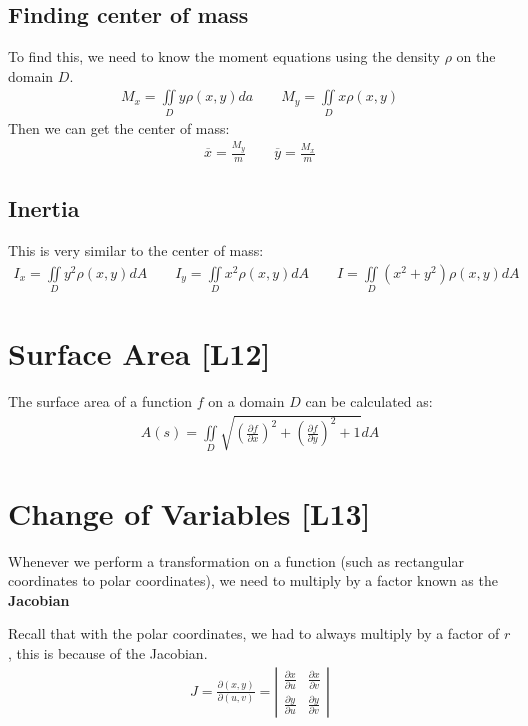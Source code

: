 \documentclass[12pt,letterpaper]{article} \usepackage{amsmath} \usepackage{graphicx} \usepackage[margin=1in]{geometry} \usepackage{longtable}  \usepackage{amssymb}
\begin{document}
	\subsection{Finding center of mass}
	To find this, we need to know the moment equations using the density $\rho$ on the domain $D$.
	\begin{align*}
		M_x = \iint\limits_D y\rho(x,y) da \qquad M_y = \iint\limits_D x\rho(x,y)
	\end{align*}
	Then we can get the center of mass:
	\begin{align*}
		\overline{x} = \frac{M_y}{m} \qquad \overline{y} = \frac{M_x}{m}
	\end{align*}
	
	\subsection{Inertia}
	This is very similar to the center of mass:
	\begin{align*}
		I_x = \iint\limits_D y^2 \rho(x,y) dA \qquad I_y = \iint\limits_D x^2 \rho(x,y)dA \qquad I = \iint\limits_D \left(x^2 + y^2 \right) \rho(x,y) dA
	\end{align*}
	
	
	\section{Surface Area [L12]}
	The surface area of a function $f$ on a domain $D$ 	can be calculated as:
	\begin{align*}
		A(s) =  \iint\limits_D \sqrt{\left(\frac{\partial f}{\partial x} \right)^2 + \left(\frac{\partial f}{\partial y}\right)^2 + 1} dA
	\end{align*}

	\section{Change of Variables [L13]}
	Whenever we perform a transformation on a function (such as rectangular coordinates to polar coordinates), we need to multiply by a factor known as the \textbf{Jacobian}
	
	Recall that with the polar coordinates, we had to always multiply by a factor of $r$, this is because of the Jacobian.
	\begin{align*}
		J = \frac{\partial (x,y) }{\partial (u,v)} = \left|\begin{array}{cc} \frac{\partial x}{\partial u} & \frac{\partial x}{\partial v} \\ \frac{\partial y}{\partial u} & \frac{\partial y}{\partial v} \end{array}\right|
	\end{align*}
	
\end{document}
